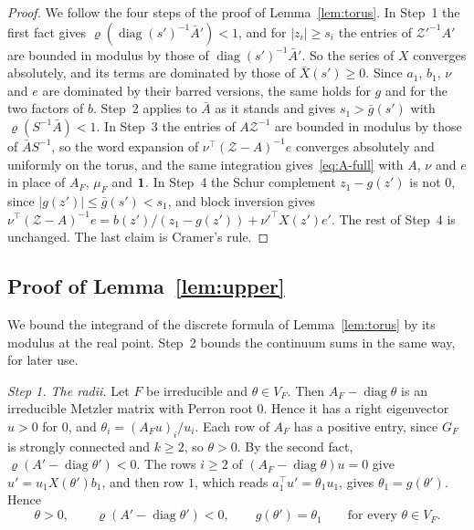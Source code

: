 \begin{proof}
We follow the four steps of the proof of Lemma~\ref{lem:torus}. In Step~1 the first fact gives
$\varrho(\operatorname{diag}(s')^{-1}\bar A')<1$, and for $|z_i|\ge s_i$ the entries of
$\mathcal Z'^{-1}A'$ are bounded in modulus by those of $\operatorname{diag}(s')^{-1}\bar A'$. So
the series of $X$ converges absolutely, and its terms are dominated by those of
$\bar X(s')\ge0$. Since $a_1$, $b_1$, $\nu$ and $e$ are dominated by their barred versions, the
same holds for $g$ and for the two factors of $b$. Step~2 applies to $\bar A$ as it stands and
gives $s_1>\bar g(s')$ with $\varrho(S^{-1}\bar A)<1$. In Step~3 the entries of $A\mathcal Z^{-1}$
are bounded in modulus by those of $\bar AS^{-1}$, so the word expansion of
$\nu^\top(\mathcal Z-A)^{-1}e$ converges absolutely and uniformly on the torus, and the same
integration gives~\eqref{eq:A-full} with $A$, $\nu$ and $e$ in place of $A_F$, $\mu_F$ and
$\mathbf{1}$. In Step~4 the Schur complement $z_1-g(z')$ is not $0$, since $|g(z')|\le\bar g(s')<s_1$,
and block inversion gives
$\nu^\top(\mathcal Z-A)^{-1}e=b(z')/(z_1-g(z'))+\nu'^\top X(z')e'$. The rest of Step~4 is
unchanged. The last claim is Cramer's rule.
\end{proof}

\subsection{Proof of \texorpdfstring{Lemma~\ref{lem:upper}}{the upper bound}}

We bound the integrand of the discrete formula of Lemma~\ref{lem:torus} by its
modulus at the real point. Step~2 bounds the continuum sums in the same way, for
later use.

\emph{Step 1. The radii.} Let $F$ be irreducible and $\theta\in V_F$. Then
$A_F-\operatorname{diag}\theta$ is an irreducible Metzler matrix with Perron
root $0$. Hence it has a right eigenvector $u>0$ for $0$, and
$\theta_i=(A_Fu)_i/u_i$. Each row of $A_F$ has a positive entry, since $G_F$
is strongly connected and $k\ge2$, so $\theta>0$. By the second fact,
$\varrho(A'-\operatorname{diag}\theta')<0$. The rows $i\ge2$ of
$(A_F-\operatorname{diag}\theta)u=0$ give $u'=u_1X(\theta')b_1$, and then row
$1$, which reads $a_1^\top u'=\theta_1u_1$, gives $\theta_1=g(\theta')$. Hence
\begin{equation}\label{eq:A-radii}
\theta>0,\qquad \varrho(A'-\operatorname{diag}\theta')<0,\qquad
g(\theta')=\theta_1\qquad\text{for every }\theta\in V_F .
\end{equation}

